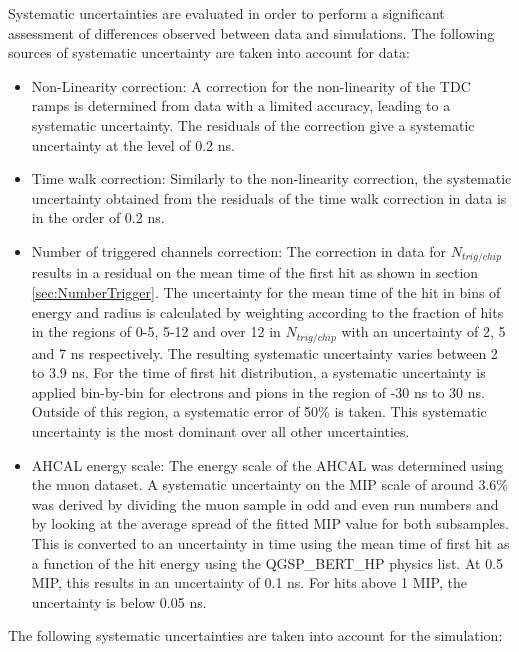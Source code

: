 \documentclass{JINST}
\begin{document}
Systematic uncertainties are evaluated in order to perform a significant assessment of differences observed between data and simulations. The following sources of systematic uncertainty are taken into account for data:
\begin{itemize}
  \item Non-Linearity correction: A correction for the non-linearity of the TDC ramps is determined from data with a limited accuracy, leading to a systematic uncertainty. The residuals of the correction give a systematic uncertainty at the level of 0.2 ns.
  \item Time walk correction: Similarly to the non-linearity correction, the systematic uncertainty obtained from the residuals of the time walk correction in data is in the order of 0.2 ns.
  \item Number of triggered channels correction: The correction in data for $N_{trig/chip}$ results in a residual on the mean time of the first hit as shown in section \ref{sec:NumberTrigger}. The uncertainty for the mean time of the hit in bins of energy and radius is calculated by weighting according to the fraction of hits in the regions of 0-5, 5-12 and over 12 in $N_{trig/chip}$ with an uncertainty of 2, 5 and 7 ns respectively. The resulting systematic uncertainty varies between 2 to 3.9 ns. For the time of first hit distribution, a systematic uncertainty is applied bin-by-bin for electrons and pions in the region of -30 ns to 30 ns. Outside of this region, a systematic error of 50\% is taken. This systematic uncertainty is the most dominant over all other uncertainties.
  \item AHCAL energy scale: The energy scale of the AHCAL was determined using the muon dataset. A systematic uncertainty on the MIP scale of around 3.6\% was derived by dividing the muon sample in odd and even run numbers and by looking at the average spread of the fitted MIP value for both subsamples. This is converted to an uncertainty in time using the mean time of first hit as a function of the hit energy using the QGSP\_BERT\_HP physics list. At 0.5 MIP, this results in an uncertainty of 0.1 ns. For hits above 1 MIP, the uncertainty is below 0.05 ns.
\end{itemize}
The following systematic uncertainties are taken into account for the simulation:
\end{document}
